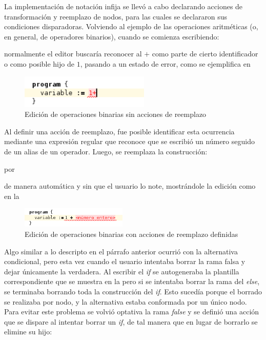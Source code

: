 La implementación de notación infija se llevó a cabo declarando acciones de transformación y reemplazo de nodos, para las cuales se declararon sus condiciones disparadoras. 
Volviendo al ejemplo de las operaciones aritméticas (o, en general, de operadores binarios), cuando se comienza escribiendo:

\centertree{
  [1
    [+]
  ]
}



normalmente el editor buscaría reconocer al $+$ como parte de cierto identificador o como posible hijo de $1$, pasando a un estado de error, como se ejemplifica en 

  \begin{figure}[h]
  \centering
  \includegraphics[width=0.55\textwidth]{assets/aritmetic-operator}
  \caption{Edición de operaciones binarias sin acciones de reemplazo}
  \label{fig:aritmetic-operator}
  \end{figure}
  

Al definir una acción de reemplazo, fue posible identificar esta ocurrencia mediante una expresión regular que reconoce que se escribió un número seguido de un alias de un operador. Luego, se reemplaza la construcción:

\centertree{
  [1
    [+]
    [empty]
  ]
}

\noindent por

\centertree{
  [+
    [1]
    [empty]
  ]
}

\noindent de manera automática y sin que el usuario lo note, mostrándole la edición como en la 

  \begin{figure}[h]
  \centering
  \includegraphics[width=0.45\textwidth]{assets/aritmetic-operator-action}
  \caption{Edición de operaciones binarias con acciones de reemplazo definidas}
  \label{fig:aritmetic-operator-action}
  \end{figure}


Algo similar a lo descripto en el párrafo anterior ocurrió con la alternativa condicional, pero esta vez cuando el usuario intentaba borrar la rama falsa y dejar únicamente la verdadera. Al escribir el \emph{if} se autogeneraba la plantilla correspondiente que se muestra en la  pero si se intentaba borrar la rama del \textit{else}, se terminaba borrando toda la construcción del \textit{if}. Esto sucedía porque el borrado se realizaba por nodo, y la alternativa estaba conformada por un único nodo. Para evitar este problema se volvió optativa la rama \textit{false} y se definió una acción que se dispare al intentar borrar un \textit{if}, de tal manera que en lugar de borrarlo se elimine su hijo:

